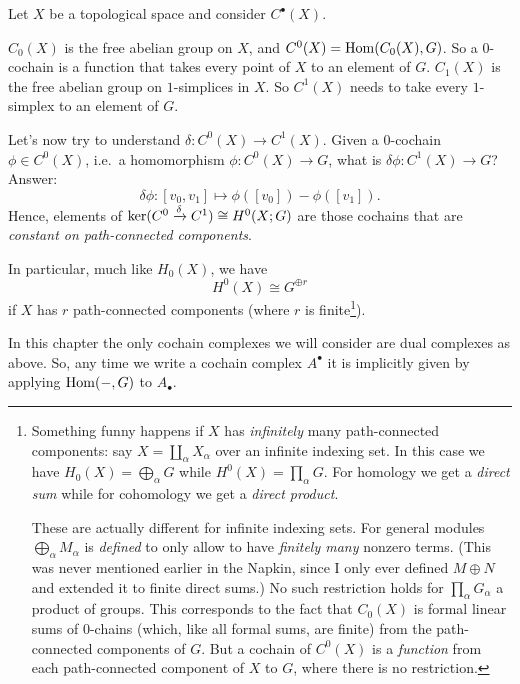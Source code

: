 \begin{example}
	[$C^0(X; G)$, $C^1(X; G)$, and $H^0(X;G)$]
	Let $X$ be a topological space and consider $C^\bullet(X)$.
	\begin{itemize}
		\ii $C_0(X)$ is the free abelian group on $X$,
		and $C^0(X) = \operatorname{Hom}(C_0(X), G)$.
		So a $0$-cochain is a function that
		takes every point of $X$ to an element of $G$.
		\ii $C_1(X)$ is the free abelian group on $1$-simplices in $X$.
		So $C^1(X)$ needs to take every $1$-simplex to an element of $G$.
	\end{itemize}
	Let's now try to understand $\delta \colon C^0(X) \to C^1(X)$.
	Given a $0$-cochain $\phi \in C^0(X)$,
	i.e.\ a homomorphism $\phi \colon C^0(X) \to G$,
	what is $\delta\phi \colon C^1(X) \to G$?
	Answer:
	\[ \delta\phi \colon [v_0, v_1] \mapsto \phi([v_0]) - \phi([v_1]). \]
	Hence, elements of
	$\ker(C^0 \xrightarrow{\delta} C^1) \cong H^0(X;G)$
	are those cochains
	that are \emph{constant on path-connected components}.
\end{example}
In particular, much like $H_0(X)$, we have \[ H^0(X) \cong G^{\oplus r} \]
if $X$ has $r$ path-connected components (where $r$ is finite\footnote{%
	Something funny happens if $X$ has \emph{infinitely} many path-connected components:
	say $X = \coprod_\alpha X_\alpha$ over an infinite indexing set.
	In this case we have
	$H_0(X) = \bigoplus_\alpha G$ while $H^0(X) = \prod_\alpha G$.
	For homology we get a \emph{direct sum} while
	for cohomology we get a \emph{direct product}.

	These are actually different for infinite indexing sets.
	For general modules $\bigoplus_\alpha M_\alpha$ is \emph{defined} to only allow
	to have \emph{finitely many} nonzero terms.
	(This was never mentioned earlier in the Napkin,
	since I only ever defined $M \oplus N$ and extended it to finite direct sums.)
	No such restriction holds for $\prod_\alpha G_\alpha$ a product of groups.
	This corresponds to the fact that $C_0(X)$ is formal linear sums of $0$-chains
	(which, like all formal sums, are finite)
	from the path-connected components of $G$.
	But a cochain of $C^0(X)$ is a \emph{function}
	from each path-connected component of $X$ to $G$,
	where there is no restriction.
}).

\begin{abuse}
	In this chapter the only cochain complexes
	we will consider are dual complexes as above.
	So, any time we write a cochain complex $A^\bullet$ it is implicitly given
	by applying $\operatorname{Hom}(-,G)$ to $A_\bullet$.
\end{abuse}

